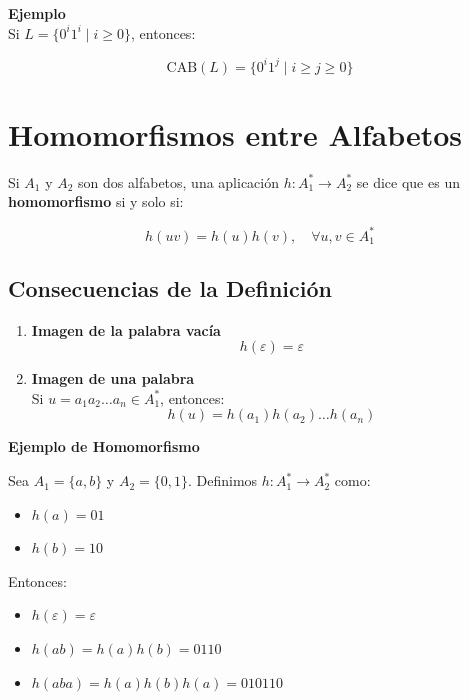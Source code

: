 \documentclass[12pt]{report} %
\begin{document}
\textbf{Ejemplo}\\
Si \(L = \{0^i1^i \mid i \geq 0\}\), entonces:

\[
\text{CAB}(L) = \{0^i1^j \mid i \geq j \geq 0\}
\]

\hypertarget{homomorfismos-entre-alfabetos}{%
\section{Homomorfismos entre
Alfabetos}\label{homomorfismos-entre-alfabetos}}

\begin{definicion}
Si $A_1$ y $A_2$ son dos alfabetos, una aplicación $h : A_1^* \to A_2^*$ se dice que es un \textbf{homomorfismo} si y solo si:

$$
h(uv) = h(u)h(v), \quad \forall u, v \in A_1^*
$$
\end{definicion}

\hypertarget{consecuencias-de-la-definiciuxf3n}{%
\subsection{Consecuencias de la
Definición}\label{consecuencias-de-la-definiciuxf3n}}

\begin{enumerate}
\def\labelenumi{\arabic{enumi}.}
\item
  \textbf{Imagen de la palabra vacía}\\
  \[
   h(\varepsilon) = \varepsilon
   \]
\item
  \textbf{Imagen de una palabra}\\
  Si \(u = a_1a_2 \ldots a_n \in A_1^*\), entonces: \[
   h(u) = h(a_1)h(a_2) \ldots h(a_n)
   \]
\end{enumerate}

\begin{ejemplo}
    \textbf{Ejemplo de Homomorfismo}

    Sea $A_1 = \{a, b\}$ y $A_2 = \{0, 1\}$. Definimos $h : A_1^* \to A_2^*$ como:

    \begin{itemize}
        \item $h(a) = 01$
        \item $h(b) = 10$
    \end{itemize}

    Entonces:

    \begin{itemize}
        \item $h(\varepsilon) = \varepsilon$
        \item $h(ab) = h(a)h(b) = 0110$
        \item $h(aba) = h(a)h(b)h(a) = 010110$
    \end{itemize}
\end{ejemplo}
\end{document}
